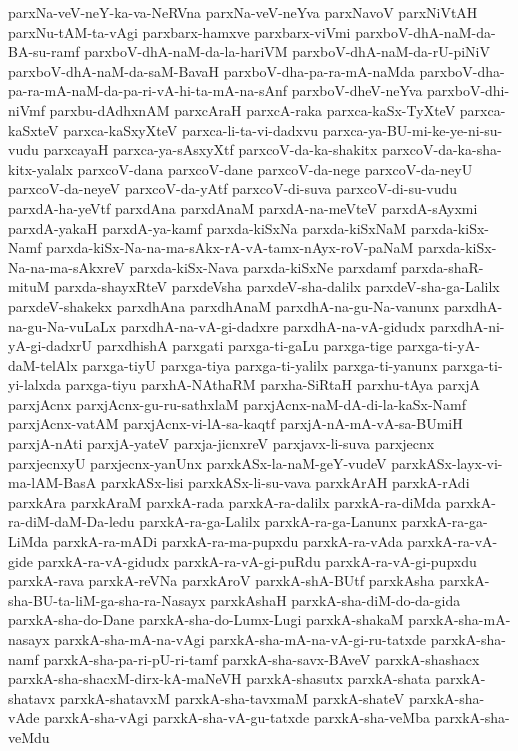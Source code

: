 {parxNa-veV-neY-ka-va-NeRVna
parxNa-veV-neYva
parxNavoV
parxNiVtAH
parxNu-tAM-ta-vAgi
parxbarx-hamxve
parxbarx-viVmi
parxboV-dhA-naM-da-BA-su-ramf
parxboV-dhA-naM-da-la-hariVM
parxboV-dhA-naM-da-rU-piNiV
parxboV-dhA-naM-da-saM-BavaH
parxboV-dha-pa-ra-mA-naMda
parxboV-dha-pa-ra-mA-naM-da-pa-ri-vA-hi-ta-mA-na-sAnf
parxboV-dheV-neYva
parxboV-dhi-niVmf
parxbu-dAdhxnAM
parxcAraH
parxcA-raka
parxca-kaSx-TyXteV
parxca-kaSxteV
parxca-kaSxyXteV
parxca-li-ta-vi-dadxvu
parxca-ya-BU-mi-ke-ye-ni-su-vudu
parxcayaH
parxca-ya-sAsxyXtf
parxcoV-da-ka-shakitx
parxcoV-da-ka-sha-kitx-yalalx
parxcoV-dana
parxcoV-dane
parxcoV-da-nege
parxcoV-da-neyU
parxcoV-da-neyeV
parxcoV-da-yAtf
parxcoV-di-suva
parxcoV-di-su-vudu
parxdA-ha-yeVtf
parxdAna
parxdAnaM
parxdA-na-meVteV
parxdA-sAyxmi
parxdA-yakaH
parxdA-ya-kamf
parxda-kiSxNa
parxda-kiSxNaM
parxda-kiSx-Namf
parxda-kiSx-Na-na-ma-sAkx-rA-vA-tamx-nAyx-roV-paNaM
parxda-kiSx-Na-na-ma-sAkxreV
parxda-kiSx-Nava
parxda-kiSxNe
parxdamf
parxda-shaR-mituM
parxda-shayxRteV
parxdeVsha
parxdeV-sha-dalilx
parxdeV-sha-ga-Lalilx
parxdeV-shakekx
parxdhAna
parxdhAnaM
parxdhA-na-gu-Na-vanunx
parxdhA-na-gu-Na-vuLaLx
parxdhA-na-vA-gi-dadxre
parxdhA-na-vA-gidudx
parxdhA-ni-yA-gi-dadxrU
parxdhishA
parxgati
parxga-ti-gaLu
parxga-tige
parxga-ti-yA-daM-telAlx
parxga-tiyU
parxga-tiya
parxga-ti-yalilx
parxga-ti-yanunx
parxga-ti-yi-lalxda
parxga-tiyu
parxhA-NAthaRM
parxha-SiRtaH
parxhu-tAya
parxjA
parxjAcnx
parxjAcnx-gu-ru-sathxlaM
parxjAcnx-naM-dA-di-la-kaSx-Namf
parxjAcnx-vatAM
parxjAcnx-vi-lA-sa-kaqtf
parxjA-nA-mA-vA-sa-BUmiH
parxjA-nAti
parxjA-yateV
parxja-jicnxreV
parxjavx-li-suva
parxjecnx
parxjecnxyU
parxjecnx-yanUnx
parxkASx-la-naM-geY-vudeV
parxkASx-layx-vi-ma-lAM-BasA
parxkASx-lisi
parxkASx-li-su-vava
parxkArAH
parxkA-rAdi
parxkAra
parxkAraM
parxkA-rada
parxkA-ra-dalilx
parxkA-ra-diMda
parxkA-ra-diM-daM-Da-ledu
parxkA-ra-ga-Lalilx
parxkA-ra-ga-Lanunx
parxkA-ra-ga-LiMda
parxkA-ra-mADi
parxkA-ra-ma-pupxdu
parxkA-ra-vAda
parxkA-ra-vA-gide
parxkA-ra-vA-gidudx
parxkA-ra-vA-gi-puRdu
parxkA-ra-vA-gi-pupxdu
parxkA-rava
parxkA-reVNa
parxkAroV
parxkA-shA-BUtf
parxkAsha
parxkA-sha-BU-ta-liM-ga-sha-ra-Nasayx
parxkAshaH
parxkA-sha-diM-do-da-gida
parxkA-sha-do-Dane
parxkA-sha-do-Lumx-Lugi
parxkA-shakaM
parxkA-sha-mA-nasayx
parxkA-sha-mA-na-vAgi
parxkA-sha-mA-na-vA-gi-ru-tatxde
parxkA-sha-namf
parxkA-sha-pa-ri-pU-ri-tamf
parxkA-sha-savx-BAveV
parxkA-shashacx
parxkA-sha-shacxM-dirx-kA-maNeVH
parxkA-shasutx
parxkA-shata
parxkA-shatavx
parxkA-shatavxM
parxkA-sha-tavxmaM
parxkA-shateV
parxkA-sha-vAde
parxkA-sha-vAgi
parxkA-sha-vA-gu-tatxde
parxkA-sha-veMba
parxkA-sha-veMdu
}
